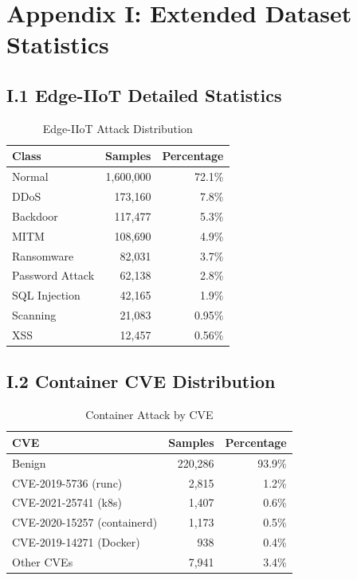 \documentclass[12pt]{article}
\begin{document}
\section{Appendix I: Extended Dataset Statistics}

\subsection{I.1 Edge-IIoT Detailed Statistics}

\begin{table}[h]
\centering
\caption{Edge-IIoT Attack Distribution}
\begin{tabular}{lrr}
\toprule
\textbf{Class} & \textbf{Samples} & \textbf{Percentage} \\
\midrule
Normal & 1,600,000 & 72.1\% \\
DDoS & 173,160 & 7.8\% \\
Backdoor & 117,477 & 5.3\% \\
MITM & 108,690 & 4.9\% \\
Ransomware & 82,031 & 3.7\% \\
Password Attack & 62,138 & 2.8\% \\
SQL Injection & 42,165 & 1.9\% \\
Scanning & 21,083 & 0.95\% \\
XSS & 12,457 & 0.56\% \\
\bottomrule
\end{tabular}
\end{table}

\subsection{I.2 Container CVE Distribution}

\begin{table}[h]
\centering
\caption{Container Attack by CVE}
\begin{tabular}{lrr}
\toprule
\textbf{CVE} & \textbf{Samples} & \textbf{Percentage} \\
\midrule
Benign & 220,286 & 93.9\% \\
CVE-2019-5736 (runc) & 2,815 & 1.2\% \\
CVE-2021-25741 (k8s) & 1,407 & 0.6\% \\
CVE-2020-15257 (containerd) & 1,173 & 0.5\% \\
CVE-2019-14271 (Docker) & 938 & 0.4\% \\
Other CVEs & 7,941 & 3.4\% \\
\bottomrule
\end{tabular}
\end{table}
\end{document}
